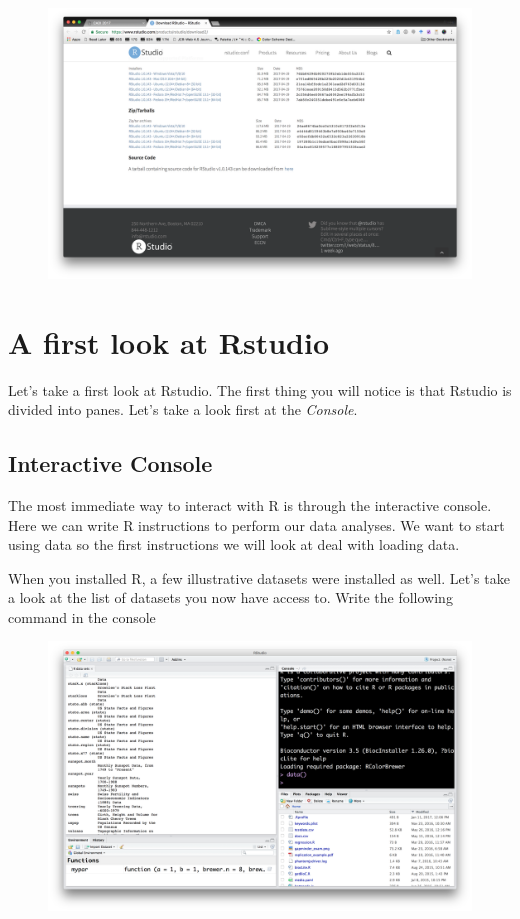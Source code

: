 \documentclass[12pt,]{book}
\theoremstyle{definition}
\theoremstyle{definition}
\theoremstyle{remark}
\begin{document}
\begin{figure}
\centering
\includegraphics{img/rstudio.png}
\caption{}
\end{figure}

\section{A first look at Rstudio}\label{a-first-look-at-rstudio}

Let's take a first look at Rstudio. The first thing you will notice is
that Rstudio is divided into panes. Let's take a look first at the
\emph{Console}.

\subsection{Interactive Console}\label{interactive-console}

The most immediate way to interact with R is through the interactive
console. Here we can write R instructions to perform our data analyses.
We want to start using data so the first instructions we will look at
deal with loading data.

When you installed R, a few illustrative datasets were installed as
well. Let's take a look at the list of datasets you now have access to.
Write the following command in the console

\begin{figure}
\centering
\includegraphics{img/rstudio_data.png}
\caption{}
\end{figure}
\end{document}
